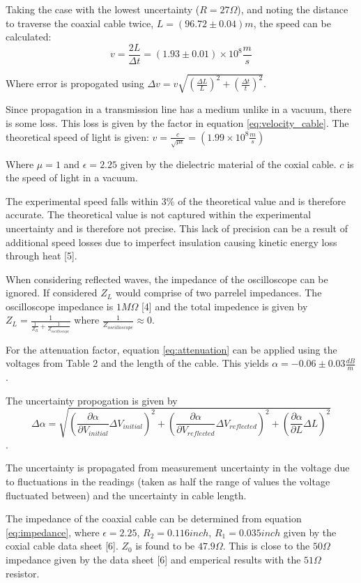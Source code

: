 \documentclass[12pt]{article}
\begin{document}
Taking the case with the lowest uncertainty ($R = 27\Omega$), and noting the distance to traverse the coaxial cable twice, $L = (96.72 \pm 0.04) m$, the speed can be calculated:
\begin{equation}
    v = \frac{2L}{\Delta t} = (1.93 \pm 0.01) \times 10^8 \frac{m}{s}
\end{equation}

Where error is propogated using $\Delta v = v\sqrt{(\frac{\Delta L}{L})^2 + (\frac{\Delta t}{t})^2}$.

Since propagation in a transmission line has a medium unlike in a vacuum, there is some loss. This loss is given by the factor in equation \ref{eq:velocity_cable}. The theoretical speed of light is given:
$v = \frac{c}{\sqrt{\mu\epsilon}} = (1.99\times10^8 \frac{m}{s})$

Where $\mu = 1$ and $\epsilon = 2.25$ given by the dielectric material of the coxial cable. $c$ is the speed of light in a vacuum.

The experimental speed falls within 3\% of the theoretical value and is therefore accurate. The theoretical value is not captured within the experimental uncertainty and is therefore not precise. This lack of precision can be a result of additional speed losses due to imperfect insulation causing kinetic energy loss through heat [5].

When considering reflected waves, the impedance of the oscilloscope can be ignored. If considered $Z_L$ would comprise of two parrelel impedances. The oscilloscope impedance is $1M\Omega$ [4] and the total impedence is given by $Z_L = \frac{1}{\frac{1}{Z_R} + \frac{1}{Z_{oscilloscope}}}$ where $\frac{1}{Z_{oscilloscope}} \approx 0$. 

For the attenuation factor, equation \ref{eq:attenuation} can be applied using the voltages from Table 2 and the length of the cable. This yields $\alpha = -0.06 \pm 0.03 \frac{dB}{m}$. 

The uncertainty propogation is given by 
$$\Delta \alpha = \sqrt{\left(\frac{\partial \alpha}{\partial V_{initial}}\Delta V_{initial}\right)^2 + \left(\frac{\partial \alpha}{\partial V_{reflected}}\Delta V_{reflected}\right)^2 + (\frac{\partial \alpha}{\partial L}\Delta L)^2}$$.

The uncertainty is propagated from measurement uncertainty in the voltage due to fluctuations in the readings (taken as half the range of values the voltage fluctuated between) and the uncertainty in cable length.

The impedance of the coaxial cable can be determined from equation \ref{eq:impedance}, where $\epsilon = 2.25$, $R_2 = 0.116inch$, $R_1 = 0.035inch$ given by the coxial cable data sheet [6]. $Z_0$ is found to be $47.9\Omega$. This is close to the $50\Omega$ impedance given by the data sheet [6] and emperical results with the $51\Omega$ resistor.
\end{document}

